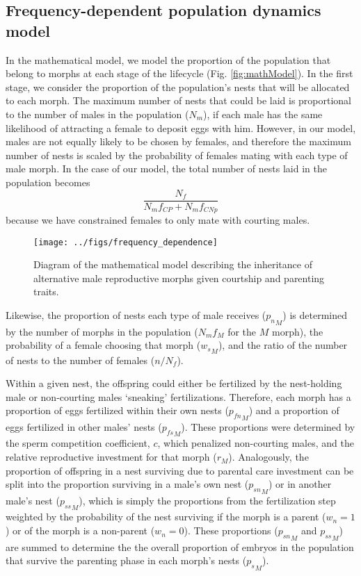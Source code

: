 \documentclass[11pt,]{article}
\begin{document}
\hypertarget{frequency-dependent-population-dynamics-model}{%
\subsection{Frequency-dependent population dynamics model}\label{frequency-dependent-population-dynamics-model}}

In the mathematical model, we model the proportion of the population
that belong to morphs at each stage of the lifecycle (Fig.
\ref{fig:mathModel}). In the first stage, we consider the proportion of
the population's nests that will be allocated to each morph. The maximum
number of nests that could be laid is proportional to the number of
males in the population (\(N_m\)), if each male has the same likelihood of
attracting a female to deposit eggs with him. However, in our model,
males are not equally likely to be chosen by females, and therefore the
maximum number of nests is scaled by the probability of females mating
with each type of male morph. In the case of our model, the total number
of nests laid in the population becomes \[
\frac{N_f}{N_mf_{CP}+N_m f_{CNp}}
\] because we have constrained females to only mate with courting males.

\begin{figure}[H]
\texttt{[image: ../figs/frequency\_dependence]} \caption{Diagram of the mathematical model describing the inheritance of alternative male reproductive morphs given courtship and parenting traits.}\label{fig:unnamed-chunk-1}
\end{figure}

Likewise, the proportion of nests each type of male receives (\({p_n}_M\))
is determined by the number of morphs in the population (\(N_mf_M\) for
the \(M\) morph), the probability of a female choosing that morph
(\({w_s}_M\)), and the ratio of the number of nests to the number of
females (\(n/N_f\)).

Within a given nest, the offspring could either be fertilized by the
nest-holding male or non-courting males `sneaking' fertilizations.
Therefore, each morph has a proportion of eggs fertilized within their
own nests (\({p_{fn}}_M\)) and a proportion of eggs fertilized in other
males' nests (\({p_{fs}}_M\)). These proportions were determined by the
sperm competition coefficient, \(c\), which penalized non-courting males,
and the relative reproductive investment for that morph (\(r_M\)).
Analogously, the proportion of offspring in a nest surviving due to
parental care investment can be split into the proportion surviving in a
male's own nest (\({p_{sn}}_M\)) or in another male's nest (\({p_{ss}}_M\)),
which is simply the proportions from the fertilization step weighted by
the probability of the nest surviving if the morph is a parent (\(w_n=1\))
or of the morph is a non-parent (\(w_n=0\)). These proportions
(\({p_{sn}}_M\) and \({p_{ss}}_M\)) are summed to determine the the overall
proportion of embryos in the population that survive the parenting phase
in each morph's nests (\({p_s}_M\)).
\end{document}
